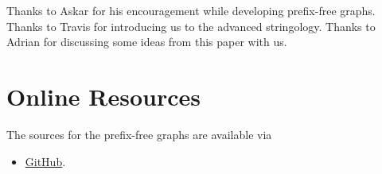 \documentclass[twocolumn]{ceurart}
\begin{document}






\begin{acknowledgments}
    Thanks to Askar for his encouragement while developing prefix-free graphs.
    Thanks to Travis for introducing us to the advanced stringology.
    Thanks to Adrian for discussing some ideas from this paper with us.
\end{acknowledgments}



\appendix

\section{Online Resources}

The sources for the prefix-free graphs are available via
\begin{itemize}
\item \href{https://github.com/andynet/pfg}{GitHub}.
\end{itemize}
\end{document}
